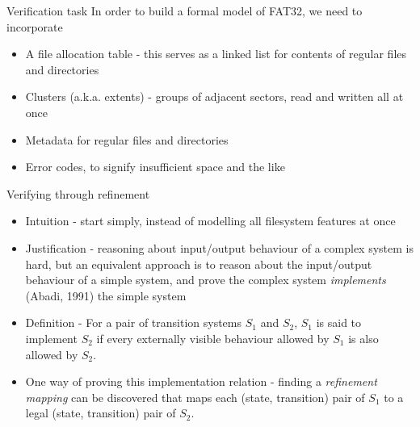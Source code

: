 \documentclass{beamer}
\begin{document}
\begin{frame}{Verification task}
  In order to build a formal model of FAT32, we need to incorporate
  \begin{itemize}
  \item A file allocation table - this serves as a linked list for
    contents of regular files and directories
  \item Clusters (a.k.a. extents) - groups of adjacent sectors, read
    and written all at once
  \item Metadata for regular files and directories
  \item Error codes, to signify insufficient space and the like
  \end{itemize}
\end{frame}

\begin{frame}{Verifying through refinement}
  \begin{itemize}
  \item Intuition - start simply, instead of modelling all
    filesystem features at once
  \item Justification - reasoning about input/output behaviour of a
    complex system is hard, but an equivalent approach is to reason
    about the input/output behaviour of a simple system, and prove the
    complex system \textit{implements} (Abadi, 1991) the simple system
  \item Definition - For a pair of transition systems $S_1$ and $S_2$,
    $S_1$ is said to implement $S_2$ if every externally visible
    behaviour allowed by $S_1$ is also allowed by $S_2$.
  \item One way of proving this implementation relation - finding a
    \textit{refinement mapping} can be discovered that maps each
    (state, transition) pair of $S_1$ to a legal (state, transition)
    pair of $S_2$.
  \end{itemize}
\end{frame}
\end{document}
